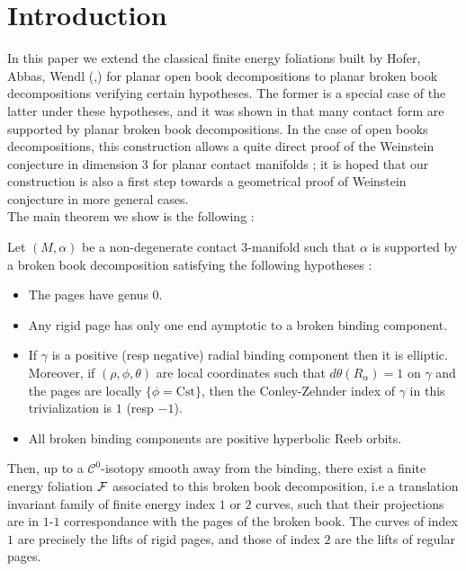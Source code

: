 \documentclass[../main.tex]{subfiles}
\begin{document}
\section{Introduction}\label{p:Intro}

In this paper we extend the classical finite energy foliations built by Hofer, Abbas, Wendl (\cite{wendl_open_2009},\cite{abbas_holomorphic_2011}) for planar open book decompositions to planar broken book decompositions verifying certain hypotheses. The former is a special case of the latter under these hypotheses, and it was shown in \cite{colin_existence_2022} that many contact form are supported by planar broken book decompositions. In the case of open books decompositions, this construction allows a quite direct proof of the Weinstein conjecture in dimension $3$ for planar contact manifolds \cite{abbas_weinstein_2005} ; it is hoped that our construction is also a first step towards a geometrical proof of Weinstein conjecture in more general cases.\\

The main theorem we show is the following : 

\begin{theorem}\label{t:théorème_1}
    Let $(M,\alpha)$ be a non-degenerate contact $3$-manifold such that $\alpha$ is supported by a broken book decomposition satisfying the following hypotheses :
    \begin{itemize}
        \item The pages have genus 0.
        \item Any rigid page has only one end aymptotic to a broken binding component.
        \item If $\gamma$ is a positive (resp negative) radial binding component then it is elliptic. Moreover, if $(\rho,\phi,\theta)$ are local coordinates such that $d\theta(R_\alpha)=1$ on $\gamma$ and the pages are locally $\{\phi = \text{Cst}\}$, then the Conley-Zehnder index of $\gamma$ in this trivialization is $1$ (resp $-1$).
        \item All broken binding components are positive hyperbolic Reeb orbits.
    \end{itemize}

    Then, up to a $\mathcal{C}^0$-isotopy smooth away from the binding, there exist a finite energy foliation $\mathcal{F}$ associated to this broken book decomposition, i.e a translation invariant family of finite energy index $1$ or $2$ curves, such that their projections are in $1$-$1$ correspondance with the pages of the broken book. The curves of index $1$ are precisely the lifts of rigid pages, and those of index $2$ are the lifts of regular pages. 
\end{theorem}
\end{document}
